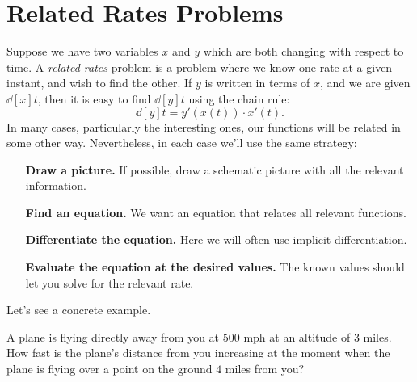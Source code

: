 \section{Related Rates Problems}

Suppose we have two variables $x$ and $y$ which are both changing with
respect to time.  A \textit{related rates} problem is a problem where
we know one rate at a given instant, and wish to find the other.  If
$y$ is written in terms of $x$, and we are given $\dd[x]{t}$, then it
is easy to find $\dd[y]{t}$ using the chain rule:
\[
\dd[y]{t}=y'(x(t))\cdot x'(t).
\]
In many cases, particularly the interesting ones, our functions will
be related in some other way. Nevertheless, in each case we'll use the
same strategy:

\begin{guidelinesForRelatedRates}\hfil
\begin{itemize}
\item[\textbf{Draw a picture.}] If possible, draw a schematic picture with all the relevant information. 
\item[\textbf{Find an equation.}] We want an equation that relates all relevant functions. 
\item[\textbf{Differentiate the equation.}] Here we will often use
  implicit differentiation.
\item[\textbf{Evaluate the equation at the desired values.} ] The known values
  should let you solve for the relevant rate.
\end{itemize}
\end{guidelinesForRelatedRates}
Let's see a concrete example. 

\begin{example}
\label{exam:receding airplane}
A plane is flying directly away from you at $500$ mph at an altitude of
$3$ miles.  How fast is the plane's distance from you increasing at the
moment when the plane is flying over a point on the ground $4$ miles
from you?
\end{example}

